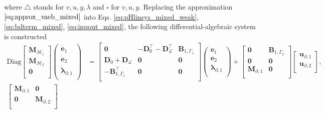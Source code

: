 where $\triangle$ stands for $v, u, y, {\lambda}$ and $\square$ for $v, u, y$. Replacing the approximation $\ref{eq:approx_vaeb_mixed}$ into Eqs. \ref{eq:pHlinsys_mixed_weak}, \ref{eq:bdterm_mixed}, \ref{eq:inpout_mixed}, the following differential-algebraic system is constructed
\begin{equation}\label{eq:pHsys_infdim_mult1}
\begin{aligned}
\mathrm{Diag}
\begin{bmatrix}
\mathbf{M}_{\mathcal{M}_1}\\
\mathbf{M}_{\mathcal{M}_2}\\
\mathbf{0}\\
\end{bmatrix}
\begin{pmatrix}
\dot{\mathbf{e}}_{1} \\
\dot{\mathbf{e}}_{2} \\
\dot{\bm{\lambda}}_{\partial, 1} \\
\end{pmatrix}
&= \begin{bmatrix}
\mathbf{0} & -\mathbf{D}_{0}^\top - \mathbf{D}_{\mathcal{L}}^\top & \mathbf{B}_{1, \Gamma_1}\\
\mathbf{D}_{0} + \mathbf{D}_{\mathcal{L}} & \mathbf{0} & \mathbf{0} \\
-\mathbf{B}_{1, \Gamma_1}^\top & \mathbf{0} & \mathbf{0} \\
\end{bmatrix} 
\begin{pmatrix}
\mathbf{e}_{1} \\
\mathbf{e}_{2} \\
{\bm{\lambda}}_{\partial, 1} \\
\end{pmatrix} + 
\begin{bmatrix}
\mathbf{0} & \mathbf{B}_{1, \Gamma_2} \\
\mathbf{0} & \mathbf{0} \\
\mathbf{M}_{\partial, 1} & \mathbf{0} \\
\end{bmatrix}
\begin{bmatrix}
\mathbf{u}_{\partial, 1} \\
\mathbf{u}_{\partial, 2} \\
\end{bmatrix}, \\
\begin{bmatrix}
\mathbf{M}_{\partial, 1} & \mathbf{0} \\
\mathbf{0} & \mathbf{M}_{\partial, 2} \\

\end{bmatrix}
\end{aligned}
\end{equation}
